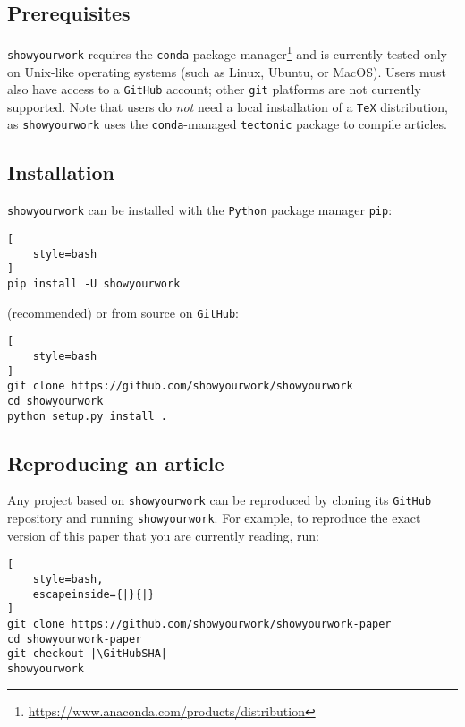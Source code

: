 \documentclass[modern]{aastex631}
\newcommand\syw{\texttt{showyourwork}\xspace}
\begin{document}
\subsection{Prerequisites}
\label{sec:usage:prereq}
\syw requires the \texttt{conda} package manager\footnote{\url{https://www.anaconda.com/products/distribution}} and is currently tested only on Unix-like operating systems (such as Linux, Ubuntu, or MacOS).
Users must also have access to a \texttt{GitHub} account; other \texttt{git} platforms are not currently supported.
Note that users do \emph{not} need a local installation of a \texttt{TeX} distribution, as \syw uses the \texttt{conda}-managed \texttt{tectonic} package to compile articles.

\subsection{Installation}
\label{sec:usage:install}
\syw can be installed with the \texttt{Python} package manager \texttt{pip}:\\

\noindent\begin{minipage}{\linewidth}
\begin{lstlisting}[
    style=bash
]
pip install -U showyourwork
\end{lstlisting}
\end{minipage}

\noindent (recommended) or from source on \texttt{GitHub}:\\

\noindent\begin{minipage}{\linewidth}
\begin{lstlisting}[
    style=bash
]
git clone https://github.com/showyourwork/showyourwork
cd showyourwork
python setup.py install .
\end{lstlisting}
\end{minipage}

\subsection{Reproducing an article}
\label{sec:usage:reproduce}
Any project based on \syw can be reproduced by cloning its \texttt{GitHub} repository and running \syw. For example, to reproduce the exact version of this paper that you are currently reading, run:\\

\noindent\begin{minipage}{\linewidth}
\begin{lstlisting}[
    style=bash,
    escapeinside={|}{|}
]
git clone https://github.com/showyourwork/showyourwork-paper
cd showyourwork-paper
git checkout |\GitHubSHA|
showyourwork
\end{lstlisting}
\end{minipage}
\end{document}
